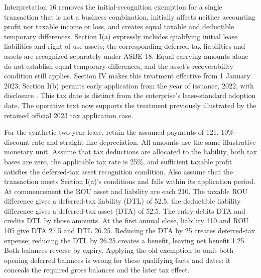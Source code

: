 Interpretation 16 removes the initial-recognition exemption for a single transaction that is not a business combination, initially affects neither accounting profit nor taxable income or loss, and creates equal taxable and deductible temporary differences. Section I(a) expressly includes qualifying initial lease liabilities and right-of-use assets; the corresponding deferred-tax liabilities and assets are recognized separately under ASBE 18. Equal carrying amounts alone do not establish equal temporary differences, and the asset's recoverability condition still applies. Section IV makes this treatment effective from 1 January 2023; Section I(b) permits early application from the year of issuance, 2022, with disclosure \citep[secs.\ I(a)--(b), IV]{mofinterpretation16}. This tax date is distinct from the enterprise's lease-standard adoption date. The operative text now supports the treatment previously illustrated by the retained official 2023 tax application case.

For the synthetic two-year lease, retain the assumed payments of 121, 10\% discount rate and straight-line depreciation. All amounts use the same illustrative monetary unit. Assume that tax deductions are allocated to the liability, both tax bases are zero, the applicable tax rate is 25\%, and sufficient taxable profit satisfies the deferred-tax asset recognition condition. Also assume that the transaction meets Section I(a)'s conditions and falls within its application period. At commencement the ROU asset and liability are each 210. The taxable ROU difference gives a deferred-tax liability (DTL) of 52.5; the deductible liability difference gives a deferred-tax asset (DTA) of 52.5. The entry debits DTA and credits DTL by those amounts. At the first annual close, liability 110 and ROU 105 give DTA 27.5 and DTL 26.25. Reducing the DTA by 25 creates deferred-tax expense; reducing the DTL by 26.25 creates a benefit, leaving net benefit 1.25. Both balances reverse by expiry. Applying the old exemption to omit both opening deferred balances is wrong for these qualifying facts and dates: it conceals the required gross balances and the later tax effect.

